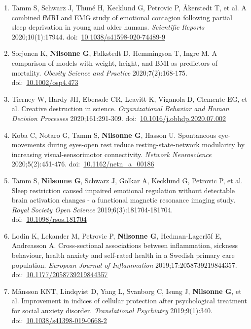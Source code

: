 \documentclass[11pt,a4paper]{article}
\begin{document}
\begin{enumerate}
\item Tamm S, Schwarz J, Thuné H, Kecklund G, Petrovic P, Åkerstedt T, et al. A combined fMRI and EMG study of emotional contagion following partial sleep deprivation in young and older humans. \textit{Scientific Reports} 2020;10(1):17944. doi:~\href{https://doi.org/10.1038/s41598-020-74489-9}{10.1038/s41598-020-74489-9}

\item Sorjonen K, \textbf{Nilsonne G}, Falkstedt D, Hemmingson T, Ingre M. A comparison of models with weight, height, and BMI as predictors of mortality. \textit{Obesity Science and Practice} 2020;7(2):168-175. doi:~\href{https://doi.org/10.1002/osp4.473}{10.1002/osp4.473}

\item Tierney W, Hardy JH, Ebersole CR, Leavitt K, Viganola D, Clemente EG, et al. Creative destruction in science. \textit{Organizational Behavior and Human Decision Processes} 2020;161:291-309. doi:~\href{https://doi.org/10.1016/j.obhdp.2020.07.002}{10.1016/j.obhdp.2020.07.002}

\item Koba C, Notaro G, Tamm S, \textbf{Nilsonne G}, Hasson U. Spontaneous eye-movements during eyes-open rest reduce resting-state-network modularity by increasing visual-sensorimotor connectivity. \textit{Network Neuroscience} 2020;5(2):451-476. doi:~\href{https://doi.org/10.1162/netn_a_00186}{10.1162/netn\_a\_00186}

\item Tamm S, \textbf{Nilsonne G}, Schwarz J, Golkar A, Kecklund G, Petrovic P, et al. Sleep restriction caused impaired emotional regulation without detectable brain activation changes - a functional magnetic resonance imaging study. \textit{Royal Society Open Science} 2019;6(3):181704-181704. doi:~\href{https://doi.org/10.1098/rsos.181704}{10.1098/rsos.181704}

\item Lodin K, Lekander M, Petrovic P, \textbf{Nilsonne G}, Hedman-Lagerlöf E, Andreasson A. Cross-sectional associations between inflammation, sickness behaviour, health anxiety and self-rated health in a Swedish primary care population. \textit{European Journal of Inflammation} 2019;17:2058739219844357. doi:~\href{https://doi.org/10.1177/2058739219844357}{10.1177/2058739219844357}

\item Månsson KNT, Lindqvist D, Yang L, Svanborg C, Isung J, \textbf{Nilsonne G}, et al. Improvement in indices of cellular protection after psychological treatment for social anxiety disorder. \textit{Translational Psychiatry} 2019;9(1):340. doi:~\href{https://doi.org/10.1038/s41398-019-0668-2}{10.1038/s41398-019-0668-2}


\end{enumerate}
\end{document}
